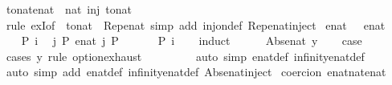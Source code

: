 \begin{isabellebody}
\ {\isachardoublequoteopen}{\isasymexists}to{\isacharunderscore}nat{\isacharcolon}{\isacharcolon}enat\ {\isasymRightarrow}\ nat{\isachardot}\ inj\ to{\isacharunderscore}nat{\isachardoublequoteclose}\isanewline
\ \ \ \ \isamarkupfalse%
\ {\isacharparenleft}rule\ exI{\isacharbrackleft}of\ {\isacharunderscore}\ {\isachardoublequoteopen}to{\isacharunderscore}nat\ {\isasymcirc}\ Rep{\isacharunderscore}enat{\isachardoublequoteclose}{\isacharbrackright}{\isacharparenright}\ {\isacharparenleft}simp\ add{\isacharcolon}\ inj{\isacharunderscore}on{\isacharunderscore}def\ Rep{\isacharunderscore}enat{\isacharunderscore}inject{\isacharparenright}\isanewline
{}\isamarkupfalse%
%
\endisatagproof
{\isafoldproof}%
%
\isadelimproof
\isanewline
%
\endisadelimproof
\isanewline
{}\isamarkupfalse%
\ enat\ {\isachardoublequoteopen}{\isasyminfinity}\ {\isacharcolon}{\isacharcolon}\ enat{\isachardoublequoteclose}\isanewline
%
\isadelimproof
%
\endisadelimproof
%
\isatagproof
{}\isamarkupfalse%
\ {\isacharminus}\isanewline
\ \ \isamarkupfalse%
\ P\ i\ \isamarkupfalse%
\ {\isachardoublequoteopen}{\isasymAnd}j{\isachardot}\ P\ {\isacharparenleft}enat\ j{\isacharparenright}{\isachardoublequoteclose}\ {\isachardoublequoteopen}P\ {\isasyminfinity}{\isachardoublequoteclose}\isanewline
\ \ \isamarkupfalse%
\ \isamarkupfalse%
\ {\isachardoublequoteopen}P\ i{\isachardoublequoteclose}\isanewline
\ \ \isamarkupfalse%
\ induct\isanewline
\ \ \ \ \isamarkupfalse%
\ {\isacharparenleft}Abs{\isacharunderscore}enat\ y{\isacharparenright}\ \isamarkupfalse%
\ \isamarkupfalse%
\ {\isacharquery}case\isanewline
\ \ \ \ \ \ \isamarkupfalse%
\ {\isacharparenleft}cases\ y\ rule{\isacharcolon}\ option{\isachardot}exhaust{\isacharparenright}\isanewline
\ \ \ \ \ \ \ \ \ {\isacharparenleft}auto\ simp{\isacharcolon}\ enat{\isacharunderscore}def\ infinity{\isacharunderscore}enat{\isacharunderscore}def{\isacharparenright}\isanewline
\ \ \isamarkupfalse%
\isanewline
{}\isamarkupfalse%
\ {\isacharparenleft}auto\ simp\ add{\isacharcolon}\ enat{\isacharunderscore}def\ infinity{\isacharunderscore}enat{\isacharunderscore}def\ Abs{\isacharunderscore}enat{\isacharunderscore}inject{\isacharparenright}%
\endisatagproof
{\isafoldproof}%
%
\isadelimproof
\isanewline
%
\endisadelimproof
\isanewline
{}\isamarkupfalse%
\ {\isacharbrackleft}{\isacharbrackleft}coercion\ {\isachardoublequoteopen}enat{\isacharcolon}{\isacharcolon}nat{\isasymRightarrow}enat{\isachardoublequoteclose}{\isacharbrackright}{\isacharbrackright}\isanewline

\end{isabellebody}
